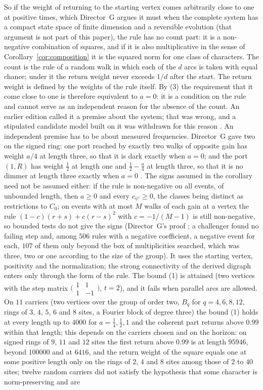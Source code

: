 So if the weight of returning to the starting vertex comes arbitrarily close to one at positive times, which Director~G argues it must when the complete system has a compact state space of finite dimension and a reversible evolution \cite{dgret} (that argument is not part of this paper), the rule has no count part: it is a non-negative combination of squares, and if it is also multiplicative in the sense of Corollary~\ref{cor:composition} it is the squared norm for one class of characters. The count is the rule of a random walk in which each of the $d$ arcs is taken with equal chance; under it the return weight never exceeds $1/d$ after the start. The return weight is defined by the weights of the rule itself. By (3) the requirement that it come close to one is therefore equivalent to $a=0$: it is a condition on the rule and cannot serve as an independent reason for the absence of the count. An earlier edition called it a premise about the system; that was wrong, and a stipulated candidate model built on it was withdrawn for this reason \cite{comp4s}. An independent premise has to be about measured frequencies. Director~G gave two on the signed ring: one port reached by exactly two walks of opposite gain has weight $a/4$ at length three, so that it is dark exactly when $a=0$; and the port $(1,R)$ has weight $\tfrac12$ at length one and $\tfrac12-\tfrac a4$ at length three, so that it is no dimmer at length three exactly when $a=0$ \cite{dgz1}. The signs assumed in the corollary need not be assumed either: if the rule is non-negative on all events, of unbounded length, then $a\ge0$ and every $c_{\psi'}\ge0$, the classes being distinct as restrictions to $C_0$; on events with at most $M$ walks of each gain at a vertex the rule $(1-c)(r+s)+c(r-s)^2$ with $c=-1/(M-1)$ is still non-negative, so bounded tests do not give the signs (Director~G's proof \cite{dgz1}; a challenger found no failing step and, among $506$ rules with a negative coefficient, a negative event for each, $107$ of them only beyond the box of multiplicities searched, which was three, two or one according to the size of the group). It uses the starting vertex, positivity and the normalization; the strong connectivity of the derived digraph enters only through the form of the rule. The bound (1) is attained (two vertices with the step matrix $\bigl(\begin{smallmatrix}1&1\\1&-1\end{smallmatrix}\bigr)$, $t=2$), and it fails when parallel arcs are allowed. On $11$ carriers (two vertices over the group of order two, $B_q$ for $q=4,6,8,12$, rings of $3$, $4$, $5$, $6$ and $8$ sites, a Fourier block of degree three) the bound (1) holds at every length up to $4000$ for $a=\tfrac14,\tfrac12,1$ and the coherent part returns above $0.99$ within that length; this depends on the carriers chosen and on the horizon: on signed rings of $9$, $11$ and $12$ sites the first return above $0.99$ is at length $95946$, beyond $100000$ and at $6416$, and the return weight of the square equals one at some positive length only on the rings of $2$, $4$ and $8$ sites among those of $2$ to $40$ sites; twelve random carriers did not satisfy the hypothesis that some character is norm-preserving and are 